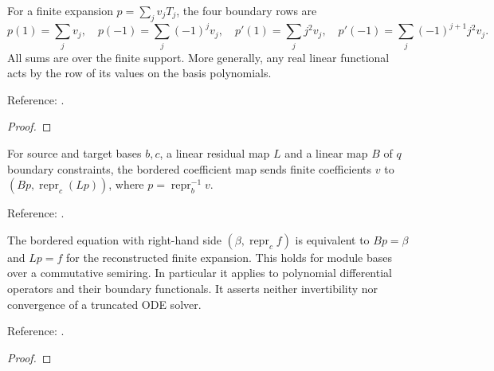 \begin{theorem}
\label{thm:chebyshev-boundary-rows}
\leanok
For a finite expansion $p=\sum_jv_jT_j$, the four boundary rows are
\[
 p(1)=\sum_jv_j,\quad p(-1)=\sum_j(-1)^jv_j,\quad
 p'(1)=\sum_jj^2v_j,\quad p'(-1)=\sum_j(-1)^{j+1}j^2v_j.
\]
All sums are over the finite support. More generally, any real linear functional
acts by the row of its values on the basis polynomials.

Reference: \cite[Sections 2.4 and 3.2]{olver-townsend}.
\end{theorem}
\begin{proof}
\leanok
\end{proof}

\begin{definition}
\label{def:bordered-coefficient-map}
\leanok
For source and target bases $b,c$, a linear residual map $L$ and a linear map
$B$ of $q$ boundary constraints, the bordered coefficient map sends finite
coefficients $v$ to $(Bp,\operatorname{repr}_c(Lp))$, where
$p=\operatorname{repr}_b^{-1}v$.

Reference: \cite[Sections 2.4 and 3.2]{olver-townsend}.
\end{definition}

\begin{theorem}
\label{thm:bordered-coefficient-map}
\leanok
The bordered equation with right-hand side $(\beta,\operatorname{repr}_c f)$
is equivalent to $Bp=\beta$ and $Lp=f$ for the reconstructed finite expansion.
This holds for module bases over a commutative semiring. In particular it applies
to polynomial differential operators and their boundary functionals.
It asserts neither invertibility nor convergence of a truncated ODE solver.

Reference: \cite[Sections 2.4 and 3.2]{olver-townsend}.
\end{theorem}
\begin{proof}
\leanok
\end{proof}

